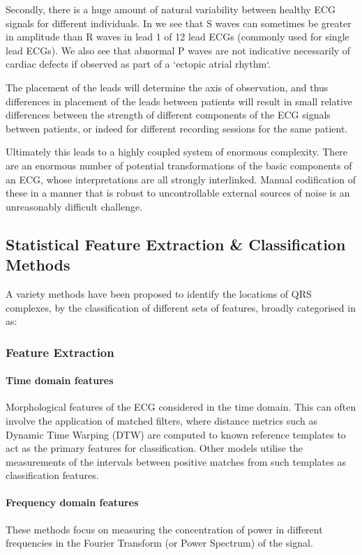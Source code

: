 \documentclass[9pt,conference]{IEEEtran}
\begin{document}
 Secondly, there is a huge amount of natural variability between healthy ECG signals for different individuals. In \cite{ecgPractice} we see that S waves can sometimes be greater in amplitude than R waves in lead 1 of 12 lead ECGs (commonly used for single lead ECGs). We also see that abnormal P waves are not indicative necessarily of cardiac defects if observed as part of  a `ectopic atrial rhythm`.

The placement of the leads will determine the axis of observation, and thus differences in placement of the leads between patients will result in small relative differences between the strength of different components of the ECG signals between patients, or indeed for different recording sessions for the same patient.

Ultimately this leads to a highly coupled system of enormous complexity. There are an enormous number of potential transformations of the basic components of an ECG, whose interpretations are all strongly interlinked. Manual codification of these in a manner that is robust to uncontrollable external sources of noise is an unreasonably difficult challenge.

\subsection{Statistical Feature Extraction \& Classification Methods}
A variety methods have been proposed to identify the locations of QRS complexes, by the classification of different sets of features, broadly categorised in \cite{Gupta2021Oct} as:

\subsubsection{Feature Extraction}
\paragraph{\textbf{Time domain features}}
Morphological features of the ECG considered in the time domain. This can often involve the application of matched filters, where distance metrics such as Dynamic Time Warping (DTW) are computed to known reference templates to act as the primary features for classification. Other models utilise the measurements of the intervals between positive matches from such templates as classification features.

\paragraph{\textbf{Frequency domain features}}
These methods focus on measuring the concentration of power in different frequencies in the Fourier Transform (or Power Spectrum) of the signal.
\end{document}
